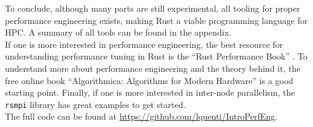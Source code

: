 To conclude, although many parts are still experimental, all tooling for proper performance engineering exists, making Rust a viable programming language for \ac{HPC}. A summary of all tools can be found in the appendix.\\

If one is more interested in performance engineering, the best resource for understanding performance tuning in Rust is the ``Rust Performance Book'' \cite{rperfbook}. To understand more about performance engineering and the theory behind it, the free online book ``Algorithmica: Algorithms for Modern Hardware'' \cite{algomodern} is a good starting point. Finally, if one is more interested in inter-node parallelism, the \texttt{rsmpi} library \cite{rsmpi} has great examples to get started.\\

The full code can be found at \url{https://github.com/lquenti/IntroPerfEng}.
